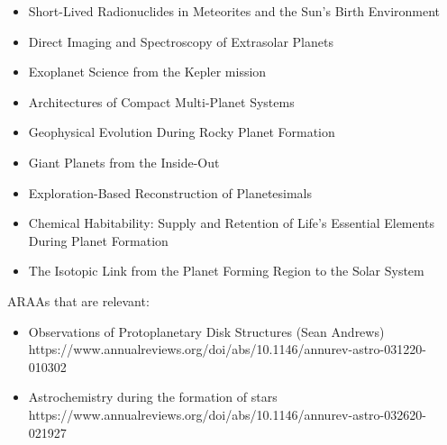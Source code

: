 \documentclass[11pt]{article}
\begin{document}
\begin{itemize}
 \item Short-Lived Radionuclides in Meteorites and the Sun’s Birth Environment
 \item Direct Imaging and Spectroscopy of Extrasolar Planets
 \item Exoplanet Science from the Kepler mission
 \item Architectures of Compact Multi-Planet Systems
 \item Geophysical Evolution During Rocky Planet Formation
 \item Giant Planets from the Inside-Out
 \item Exploration-Based Reconstruction of Planetesimals
 \item Chemical Habitability: Supply and Retention of Life’s Essential Elements During Planet Formation
 \item The Isotopic Link from the Planet Forming Region to the Solar System
\end{itemize}


ARAAs that are relevant:
\begin{itemize}
    \item Observations of Protoplanetary Disk Structures (Sean Andrews) https://www.annualreviews.org/doi/abs/10.1146/annurev-astro-031220-010302
    \item Astrochemistry during the formation of stars https://www.annualreviews.org/doi/abs/10.1146/annurev-astro-032620-021927
\end{itemize}



\end{document}
